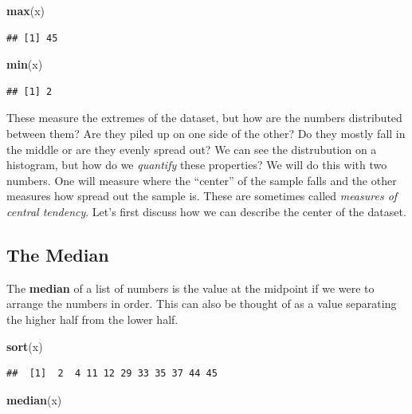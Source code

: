 \documentclass[]{book}
\newenvironment{Shaded}{\begin{snugshade}}{\end{snugshade}}
\newcommand{\KeywordTok}[1]{\textcolor[rgb]{0.13,0.29,0.53}{\textbf{#1}}}
\newcommand{\NormalTok}[1]{#1}
\begin{document}
\begin{Shaded}
\begin{Highlighting}[]
\KeywordTok{max}\NormalTok{(x)}
\end{Highlighting}
\end{Shaded}

\begin{verbatim}
## [1] 45
\end{verbatim}

\begin{Shaded}
\begin{Highlighting}[]
\KeywordTok{min}\NormalTok{(x)}
\end{Highlighting}
\end{Shaded}

\begin{verbatim}
## [1] 2
\end{verbatim}

These measure the extremes of the dataset, but how are the numbers distributed between them? Are they piled up on one side of the other? Do they mostly fall in the middle or are they evenly spread out? We can see the distrubution on a histogram, but how do we \emph{quantify} these properties? We will do this with two numbers. One will measure where the ``center'' of the sample falls and the other measures how spread out the sample is. These are sometimes called \emph{measures of central tendency}. Let's first discuss how we can describe the center of the dataset.

\hypertarget{the-median}{%
\subsection{The Median}\label{the-median}}

The \textbf{median} of a list of numbers is the value at the midpoint if we were to arrange the numbers in order. This can also be thought of as a value separating the higher half from the lower half.

\begin{Shaded}
\begin{Highlighting}[]
\KeywordTok{sort}\NormalTok{(x)}
\end{Highlighting}
\end{Shaded}

\begin{verbatim}
##  [1]  2  4 11 12 29 33 35 37 44 45
\end{verbatim}

\begin{Shaded}
\begin{Highlighting}[]
\KeywordTok{median}\NormalTok{(x)}
\end{Highlighting}
\end{Shaded}
\end{document}

